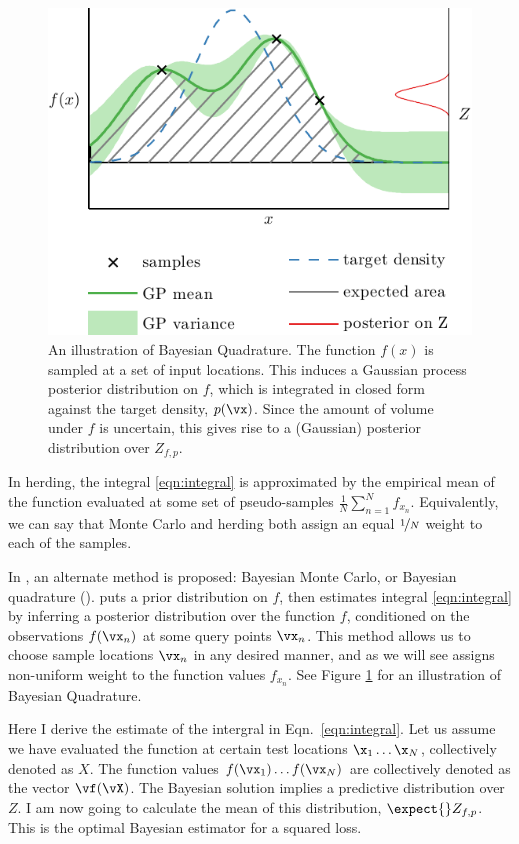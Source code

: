 \begin{figure}
\centering
\includegraphics[width=.8\columnwidth]{figs/herding/bq_intro4}
\caption[An illustration of Bayesian quadrature]{An illustration of Bayesian Quadrature. The function $f(x)$ is sampled at a set of input locations. This induces a Gaussian process posterior distribution on $f$, which is integrated in closed form against the target density, $p(\vx)$. Since the amount of volume under $f$ is uncertain, this gives rise to a (Gaussian) posterior distribution over $Z_{f,p}$.}
\label{fig:bq_intro}
\end{figure}

In herding, the integral \eqref{eqn:integral} is approximated by the empirical mean of the function evaluated at some set of pseudo-samples $\frac{1}{N}\sum_{n=1}^{N}f_{x_n}$. Equivalently, we can say that Monte Carlo and herding both assign an equal $\nicefrac{1}{N}$ weight to each of the samples.

In \citep{BZMonteCarlo}, an alternate method is proposed: Bayesian Monte Carlo, or Bayesian quadrature (\bq). \bq{} puts a prior distribution on $f$, then estimates integral \eqref{eqn:integral} by inferring a posterior distribution over the function $f$, conditioned on the observations $f(\vx_n)$ at some query points $\vx_n$. This method allows us to choose sample locations $\vx_n$ in any desired manner, and as we will see assigns non-uniform weight to the function values $f_{x_n}$. See Figure \ref{fig:bq_intro} for an illustration of Bayesian Quadrature.

Here I derive the \bq{} estimate of the intergral in Eqn.\ \eqref{eqn:integral}. Let us assume we have evaluated the function at certain test locations $\x_1 \ldots \x_N$, collectively denoted as $X$. The function values $f(\vx_1) \ldots f(\vx_N)$ are collectively denoted as the vector $\vf(\vX)$. The Bayesian solution implies a predictive distribution over $Z$. I am now going to calculate the mean of this distribution, $\expect{}Z_{f,p}$. This is the optimal Bayesian estimator for a squared loss.

